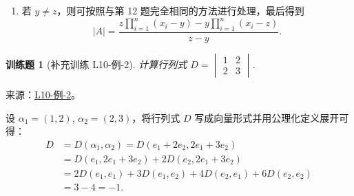 \documentclass[UTF8,12pt,a4paper,fontset=fandol]{ctexart}
\newtheorem{exercise}{训练题}[section]
\begin{document}
\begin{solve}
\begin{enumerate}
\begin{enumerate}
\begin{align*}
\begin{vmatrix}
                                        0                                & 0      & x_2-y  & 0      & \cdots & 0      \\
                                        0                                & 0      & 0      & x_3-y  & \cdots & 0      \\
                                        \vdots                           & \vdots & \vdots & \vdots & \ddots & \vdots \\
                                        0                                & 0      & 0      & 0      & \cdots & x_n-y
                                    \end{vmatrix} \\
                                    &= \prod_{j=1}^n (x_j - y) + y\sum_{i=1}^n \prod_{j \neq i} (x_j - y).
                                \end{align*}
                    \end{enumerate}
                    综上，当 $y = z$ 时，
                    \[
                        |A| = \prod_{j=1}^n (x_j - y) + y\sum_{i=1}^n \prod_{j \neq i} (x_j - y).
                    \]

                \item 若 $y \neq z$，则可按照与第 12 题完全相同的方法进行处理，最后得到
                    \[
                        |A| = \frac{z \prod_{i=1}^n (x_i - y) - y \prod_{i=1}^n (x_i - z)}{z - y}.
                    \]
            \end{enumerate}
\end{solve}

\begin{exercise}[补充训练 L10-例-2]\label{prob:L10-例-2}
计算行列式 $D = \begin{vmatrix}
        1 & 2 \\
        2 & 3
    \end{vmatrix}$.
\end{exercise}
\noindent 来源：\href{https://github.com/yhwu-is/Linear-Algebra-Left-Undone/blob/new/%E8%AE%B2%E4%B9%89/%E4%B8%93%E9%A2%98/10%20%E8%A1%8C%E5%88%97%E5%BC%8F.tex}{L10-例-2}。
\begin{solve}
设 $\alpha_1 = (1, 2)$, $\alpha_2 = (2, 3)$，将行列式 $D$ 写成向量形式并用公理化定义展开可得：
    \begin{align*}
        D &= D(\alpha_1, \alpha_2) = D(e_1 + 2e_2, 2e_1 + 3e_2) \\
          &= D(e_1, 2e_1 + 3e_2) + 2 D(e_2, 2e_1 + 3e_2) \\
          &= 2D(e_1, e_1) + 3D(e_1, e_2) + 4D(e_2, e_1) + 6D(e_2, e_2) \\
          &= 3 - 4 = -1.
    \end{align*}
\end{solve}
\end{document}
